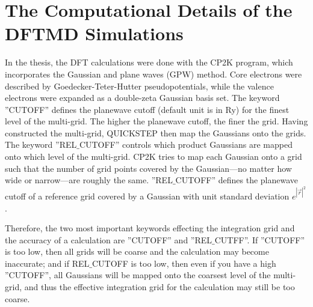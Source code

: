 \section{The Computational Details of the DFTMD Simulations}
In the thesis, the DFT calculations were done with the CP2K program, which incorporates the Gaussian and plane waves (GPW) method\cite{GL99}. 
Core electrons were described by Goedecker-Teter-Hutter pseudopotentials\cite{MK05}, while the valence electrons were expanded as a double-zeta Gaussian basis set.
The keyword ''CUTOFF'' defines the planewave cutoff (default unit is in Ry) for the finest level of the multi-grid. 
The higher the planewave cutoff, the finer the grid.
Having constructed the multi-grid, QUICKSTEP then map the Gaussians onto the grids. The keyword ''REL$\_$CUTOFF'' controls which product Gaussians 
are mapped onto which level of the multi-grid. CP2K tries to map each Gaussian onto a grid such that the number of grid points 
covered by the Gaussian---no matter how wide or narrow---are roughly the same. ''REL$\_$CUTOFF'' defines the planewave cutoff of a reference grid 
covered by a Gaussian with unit standard deviation $e^{|\vec r|^2}$.\cite{CP2K}

Therefore, the two most important keywords effecting the integration grid and the accuracy of a calculation are ''CUTOFF'' and ''REL$\_$CUTFF''.
If ''CUTOFF'' is too low, then all grids will be coarse and the calculation may become inaccurate; and if REL$\_$CUTOFF is too low, then even if you have a high ''CUTOFF'', 
all Gaussians will be mapped onto the coarsest level of the multi-grid, and thus the effective integration grid for the calculation may still be too coarse.

